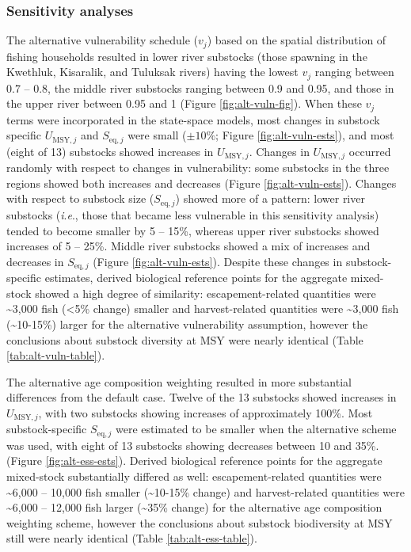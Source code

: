\documentclass[12pt,]{book}
\theoremstyle{definition}
\theoremstyle{definition}
\theoremstyle{definition}
\theoremstyle{remark}
\begin{document}
\subsubsection{Sensitivity analyses}\label{sensitivity-analyses}

\noindent
The alternative vulnerability schedule (\(v_j\)) based on the spatial
distribution of fishing households resulted in lower river substocks
(those spawning in the Kwethluk, Kisaralik, and Tuluksak rivers) having
the lowest \(v_j\) ranging between 0.7 -- 0.8, the middle river
substocks ranging between 0.9 and 0.95, and those in the upper river
between 0.95 and 1 (Figure \ref{fig:alt-vuln-fig}). When these \(v_j\)
terms were incorporated in the state-space models, most changes in
substock specific \(U_{\text{MSY},j}\) and \(S_{\text{eq},j}\) were
small (\(\pm 10\%\); Figure \ref{fig:alt-vuln-ests}), and most (eight of
13) substocks showed increases in \(U_{\text{MSY},j}\). Changes in
\(U_{\text{MSY},j}\) occurred randomly with respect to changes in
vulnerability: some substocks in the three regions showed both increases
and decreases (Figure \ref{fig:alt-vuln-ests}). Changes with respect to
substock size (\(S_{\text{eq},j}\)) showed more of a pattern: lower
river substocks (\emph{i}.\emph{e}., those that became less vulnerable
in this sensitivity analysis) tended to become smaller by 5 -- 15\%,
whereas upper river substocks showed increases of 5 -- 25\%. Middle
river substocks showed a mix of increases and decreases in
\(S_{\text{eq},j}\) (Figure \ref{fig:alt-vuln-ests}). Despite these
changes in substock-specific estimates, derived biological reference
points for the aggregate mixed-stock showed a high degree of similarity:
escapement-related quantities were \textasciitilde{}3,000 fish
(\textless{}5\% change) smaller and harvest-related quantities were
\textasciitilde{}3,000 fish (\textasciitilde{}10-15\%) larger for the
alternative vulnerability assumption, however the conclusions about
substock diversity at MSY were nearly identical (Table
\ref{tab:alt-vuln-table}).

The alternative age composition weighting resulted in more substantial
differences from the default case. Twelve of the 13 substocks showed
increases in \(U_{\text{MSY},j}\), with two substocks showing increases
of approximately 100\%. Most substock-specific \(S_{\text{eq},j}\) were
estimated to be smaller when the alternative scheme was used, with eight
of 13 substocks showing decreases between 10 and 35\%. (Figure
\ref{fig:alt-ess-ests}). Derived biological reference points for the
aggregate mixed-stock substantially differed as well: escapement-related
quantities were \textasciitilde{}6,000 -- 10,000 fish smaller
(\textasciitilde{}10-15\% change) and harvest-related quantities were
\textasciitilde{}6,000 -- 12,000 fish larger (\textasciitilde{}35\%
change) for the alternative age composition weighting scheme, however
the conclusions about substock biodiversity at MSY still were nearly
identical (Table \ref{tab:alt-ess-table}).
\end{document}
